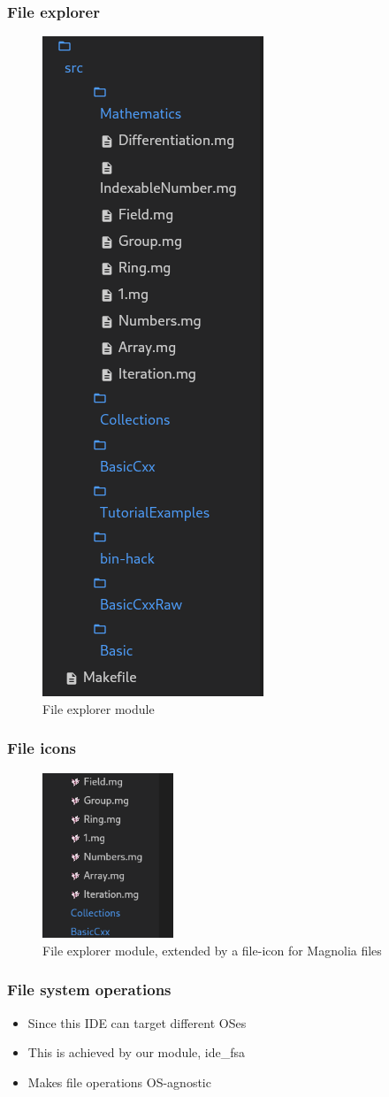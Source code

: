 \begin{frame}
  \frametitle{File explorer}
  \begin{figure}
    \centering
    \includegraphics[height=0.5\textwidth]{./pics/ide-explorer.png}
    \caption{
      File explorer module
    }
  \end{figure}
\end{frame}

\begin{frame}
  \frametitle{File icons}
  \begin{figure}
    \centering
    \includegraphics[width=0.35\textwidth]{./pics/file-explorer-icons.png}
    \caption{
      File explorer module, extended by a file-icon for Magnolia files
    }
  \end{figure}
\end{frame}

\begin{frame}
  \frametitle{File system operations}
  \begin{itemize}
    \item Since this IDE can target different OSes
    \item This is achieved by our module, ide\_fsa
    \item Makes file operations OS-agnostic
  \end{itemize}
\end{frame}

